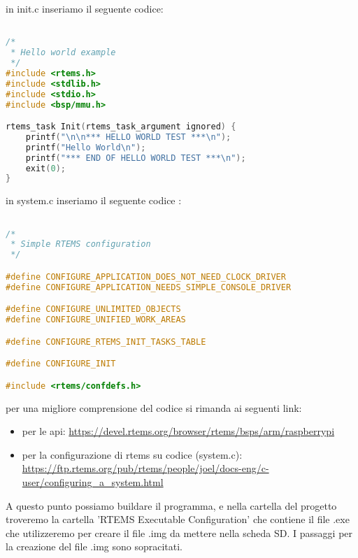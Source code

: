 \documentclass[10pt, a4paper]{article}
\begin{document}
\begin{flushleft}
in init.c inseriamo il seguente codice:
\begin{lstlisting}[language=c] 

/*
 * Hello world example
 */
#include <rtems.h>
#include <stdlib.h>
#include <stdio.h>
#include <bsp/mmu.h>

rtems_task Init(rtems_task_argument ignored) {
	printf("\n\n*** HELLO WORLD TEST ***\n");
	printf("Hello World\n");
	printf("*** END OF HELLO WORLD TEST ***\n");
	exit(0);
}


\end{lstlisting}
in system.c inseriamo il seguente codice :

\begin{lstlisting}[language=c] 

/*
 * Simple RTEMS configuration
 */

#define CONFIGURE_APPLICATION_DOES_NOT_NEED_CLOCK_DRIVER
#define CONFIGURE_APPLICATION_NEEDS_SIMPLE_CONSOLE_DRIVER

#define CONFIGURE_UNLIMITED_OBJECTS
#define CONFIGURE_UNIFIED_WORK_AREAS

#define CONFIGURE_RTEMS_INIT_TASKS_TABLE

#define CONFIGURE_INIT

#include <rtems/confdefs.h>

\end{lstlisting}

per una migliore comprensione del codice si rimanda ai seguenti link:
\begin{itemize}
\item per le api: \url{https://devel.rtems.org/browser/rtems/bsps/arm/raspberrypi}
\item per la configurazione di rtems su codice (system.c): \url{https://ftp.rtems.org/pub/rtems/people/joel/docs-eng/c-user/configuring_a_system.html}
\end{itemize}

A questo punto possiamo buildare il programma, e nella cartella del progetto troveremo la cartella 'RTEMS Executable Configuration' che contiene il file .exe che utilizzeremo per creare il file .img da mettere nella scheda SD.
I passaggi per la creazione del file .img sono sopracitati.

\newpage

\end{flushleft}
\end{document}
